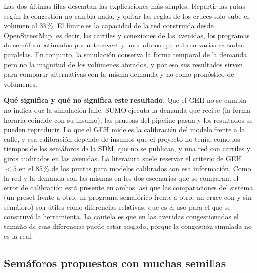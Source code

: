Las dos últimas filas descartan las explicaciones más simples. Repartir las rutas según la congestión no cambia nada, y quitar las reglas de los cruces solo sube el volumen al 33\,\%. El límite es la capacidad de la red construida desde OpenStreetMap, es decir, los carriles y conexiones de las avenidas, los programas de semáforo estimados por netconvert y unos aforos que cubren varias calzadas paralelas. En conjunto, la simulación conserva la forma temporal de la demanda pero no la magnitud de los volúmenes aforados, y por eso sus resultados sirven para comparar alternativas con la misma demanda y no como pronóstico de volúmenes.

\textbf{Qué significa y qué no significa este resultado.} Que el GEH no se cumpla no indica que la simulación falle. SUMO ejecuta la demanda que recibe (la forma horaria coincide con su insumo), las pruebas del pipeline pasan y los resultados se pueden reproducir. Lo que el GEH mide es la calibración del modelo frente a la calle, y esa calibración depende de insumos que el proyecto no tenía, como los tiempos de los semáforos de la SDM, que no se publican, y una red con carriles y giros auditados en las avenidas. La literatura suele reservar el criterio de GEH $<5$ en el 85\,\% de los puntos para modelos calibrados con esa información. Como la red y la demanda son las mismas en los dos escenarios que se comparan, el error de calibración está presente en ambos, así que las comparaciones del sistema (un preset frente a otro, un programa semafórico frente a otro, un cruce con y sin semáforo) son útiles como diferencias relativas, que es el uso para el que se construyó la herramienta. La cautela es que en las avenidas congestionadas el tamaño de esas diferencias puede estar sesgado, porque la congestión simulada no es la real.

\subsection{Semáforos propuestos con muchas semillas}
\label{sec:semillas}

